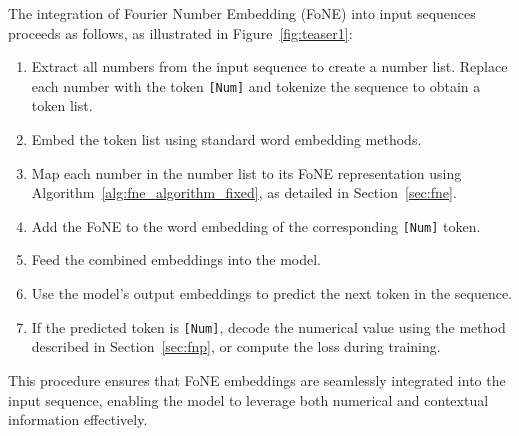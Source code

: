 The integration of Fourier Number Embedding (FoNE) into input sequences proceeds as follows, as illustrated in Figure~\ref{fig:teaser1}:

\begin{enumerate}[itemsep=-2pt,topsep=0pt,leftmargin=15pt]
    \item Extract all numbers from the input sequence to create a number list. Replace each number with the token \texttt{[Num]} and tokenize the sequence to obtain a token list.
    \item Embed the token list using standard word embedding methods.
    \item Map each number in the number list to its FoNE representation using Algorithm~\ref{alg:fne_algorithm_fixed}, as detailed in Section~\ref{sec:fne}.
    \item Add the FoNE to the word embedding of the corresponding \texttt{[Num]} token.
    \item Feed the combined embeddings into the model.
    \item Use the model's output embeddings to predict the next token in the sequence.
    \item If the predicted token is \texttt{[Num]}, decode the numerical value using the method described in Section~\ref{sec:fnp}, or compute the loss during training.
\end{enumerate}
This procedure ensures that FoNE embeddings are seamlessly integrated into the input sequence, enabling the model to leverage both numerical and contextual information effectively.
